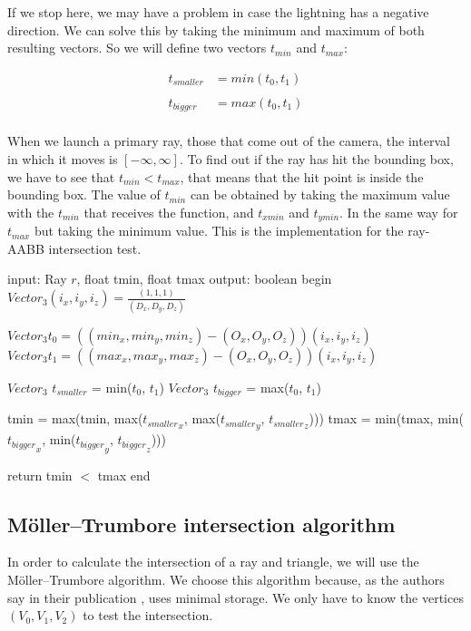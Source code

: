 \documentclass[titlepage,12pt]{report}
\begin{document}
If we stop here, we may have a problem in case the lightning has a negative direction. We can solve this by taking the minimum and maximum of both resulting vectors. So we will define two vectors $t_{min}$ and $t_{max}$:

\begin{equation} \label{slab_method_3}
\begin{split}
t_{smaller} & = min(t_0, t_1) \\
\\
t_{bigger} & = max(t_0, t_1) \\
\end{split} 
\end{equation}

When we launch a primary ray, those that come out of the camera, the interval in which it moves is $[-\infty, \infty]$. To find out if the ray has hit the bounding box, we have to see that $t_{min} < t_{max}$, that means that the hit point is inside the bounding box. The value of $t_{min}$ can be obtained by taking the maximum value with the $t_{min}$ that receives the function, and $t_{xmin}$ and $t_{ymin}$. In the same way for $t_{max}$ but taking the minimum value. This is the implementation for the ray-AABB intersection test.

\begin{algorithm}[caption={collision}]
input: Ray $r$, float tmin, float tmax
output: boolean
begin
  $Vector_3 (i_x, i_y, i_z) = \frac{(1,1,1)}{(D_x, D_y, D_z)}$
  
  $Vector_3 t_0 = ((min_x, min_y, min_z) - (O_x, O_y, O_z)) (i_x, i_y, i_z)$
  $Vector_3 t_1 = ((max_x, max_y, max_z) - (O_x, O_y, O_z)) (i_x, i_y, i_z)$

  $Vector_3$ $t_{smaller}$ = min($t_0$, $t_1$)
  $Vector_3$ $t_{bigger}$ = max($t_0$, $t_1$)
  
  tmin = max(tmin, max(${t_{smaller}}_x$, max(${t_{smaller}}_y$, ${t_{smaller}}_z$)))
  tmax = min(tmax, min(${t_{bigger}}_x$, min(${t_{bigger}}_y$, ${t_{bigger}}_z$)))
  
  return tmin $<$ tmax
end
\end{algorithm}

\subsection{Möller–Trumbore intersection algorithm}

In order to calculate the intersection of a ray and triangle, we will use the Möller–Trumbore algorithm. We choose this algorithm because, as the authors say in their publication \citep{Moller2005}, uses minimal storage. We only have to know the vertices $(V_0,V_1,V_2)$ to test the intersection.
\end{document}

